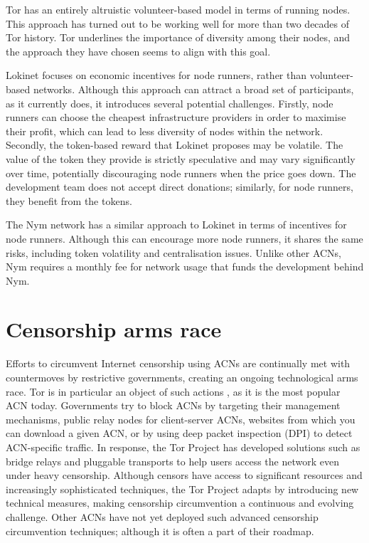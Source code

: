 Tor has an entirely altruistic volunteer-based model in terms of running nodes. This approach has turned out to be working well for more than two decades of Tor history. Tor underlines the importance of diversity among their nodes, and the approach they have chosen seems to align with this goal.

Lokinet focuses on economic incentives for node runners, rather than volunteer-based networks. Although this approach can attract a broad set of participants, as it currently does, it introduces several potential challenges. Firstly, node runners can choose the cheapest infrastructure providers in order to maximise their profit, which can lead to less diversity of nodes within the network. Secondly, the token-based reward that Lokinet proposes may be volatile. The value of the token they provide is strictly speculative and may vary significantly over time, potentially discouraging node runners when the price goes down. The development team does not accept direct donations; similarly, for node runners, they benefit from the tokens.

The Nym network has a similar approach to Lokinet in terms of incentives for node runners. Although this can encourage more node runners, it shares the same risks, including token volatility and centralisation issues. Unlike other ACNs, Nym requires a monthly fee for network usage that funds the development behind Nym.

\section{Censorship arms race}
Efforts to circumvent Internet censorship using ACNs are continually met with countermoves by restrictive governments, creating an ongoing technological arms race. Tor is in particular an object of such actions \cite{tor-arms-race}, as it is the most popular ACN today. Governments try to block ACNs by targeting their management mechanisms, public relay nodes for client-server ACNs, websites from which you can download a given ACN, or by using deep packet inspection (DPI) to detect ACN-specific traffic. In response, the Tor Project has developed solutions such as bridge relays and pluggable transports to help users access the network even under heavy censorship. Although censors have access to significant resources and increasingly sophisticated techniques, the Tor Project adapts by introducing new technical measures, making censorship circumvention a continuous and evolving challenge. Other ACNs have not yet deployed such advanced censorship circumvention techniques; although it is often a part of their roadmap.

